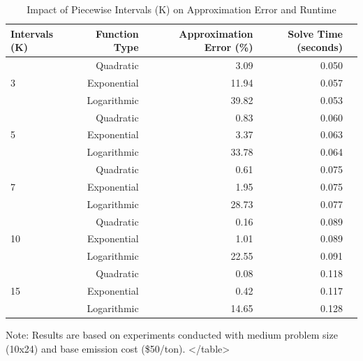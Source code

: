 \begin{table}[htbp]
\begin{table}[htbp]
\begin{table}[htbp]
\begin{table}[htbp]
\begin{table}[htbp]
    \centering
    \caption{Impact of Piecewise Intervals (K) on Approximation Error and Runtime}
    \label{tab:piecewise_approximation}
    \begin{tabular}{lrrrr}
        \toprule
        Intervals (K) & Function Type & Approximation Error (\%) & Solve Time (seconds) \\
        \midrule
        \multirow{3}{*}{3} & Quadratic & 3.09 & 0.050 \\
         & Exponential & 11.94 & 0.057 \\
         & Logarithmic & 39.82 & 0.053 \\
        \midrule
        \multirow{3}{*}{5} & Quadratic & 0.83 & 0.060 \\
         & Exponential & 3.37 & 0.063 \\
         & Logarithmic & 33.78 & 0.064 \\
        \midrule
        \multirow{3}{*}{7} & Quadratic & 0.61 & 0.075 \\
         & Exponential & 1.95 & 0.075 \\
         & Logarithmic & 28.73 & 0.077 \\
        \midrule
        \multirow{3}{*}{10} & Quadratic & 0.16 & 0.089 \\
         & Exponential & 1.01 & 0.089 \\
         & Logarithmic & 22.55 & 0.091 \\
        \midrule
        \multirow{3}{*}{15} & Quadratic & 0.08 & 0.118 \\
         & Exponential & 0.42 & 0.117 \\
         & Logarithmic & 14.65 & 0.128 \\
        \bottomrule
    \end{tabular}
    \footnotesize{Note: Results are based on experiments conducted with medium problem size (10x24) and base emission cost (\$50/ton).}
</table>


\end{table}
\end{table}
\end{table}
\end{table}
\end{table}
